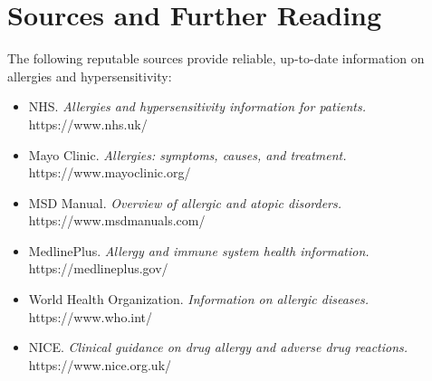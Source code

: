 \section*{Sources and Further Reading}
The following reputable sources provide reliable, up-to-date information on allergies and hypersensitivity:

\begin{itemize}
    \item NHS. \textit{Allergies and hypersensitivity information for patients.} https://www.nhs.uk/
    \item Mayo Clinic. \textit{Allergies: symptoms, causes, and treatment.} https://www.mayoclinic.org/
    \item MSD Manual. \textit{Overview of allergic and atopic disorders.} https://www.msdmanuals.com/
    \item MedlinePlus. \textit{Allergy and immune system health information.} https://medlineplus.gov/
    \item World Health Organization. \textit{Information on allergic diseases.} https://www.who.int/
    \item NICE. \textit{Clinical guidance on drug allergy and adverse drug reactions.} https://www.nice.org.uk/
\end{itemize}
